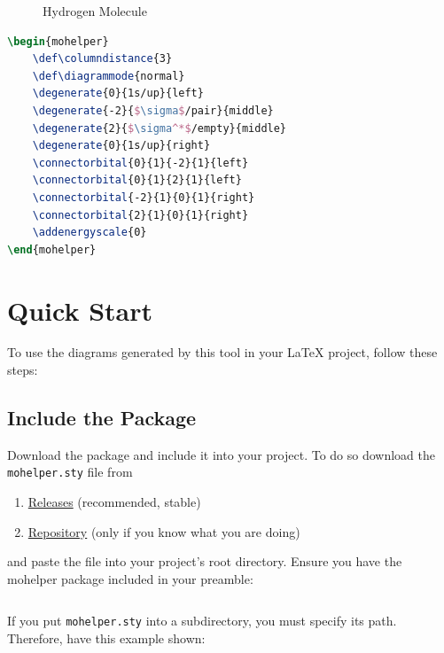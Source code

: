 \documentclass[12pt, a4paper]{article}
\begin{document}
\begin{figure}[h]
    \centering
    \begin{mohelper}
        \def\columndistance{3}
        \def\diagrammode{normal}
    \end{mohelper}
    \caption{Hydrogen Molecule}
    \label{fig:modiagram1}
\end{figure}

\begin{lstlisting}[language=TeX]
\begin{mohelper}
	\def\columndistance{3}
	\def\diagrammode{normal}
	\degenerate{0}{1s/up}{left}
	\degenerate{-2}{$\sigma$/pair}{middle}
	\degenerate{2}{$\sigma^*$/empty}{middle}
	\degenerate{0}{1s/up}{right}
	\connectorbital{0}{1}{-2}{1}{left}
	\connectorbital{0}{1}{2}{1}{left}
	\connectorbital{-2}{1}{0}{1}{right}
	\connectorbital{2}{1}{0}{1}{right}
	\addenergyscale{0}
\end{mohelper}
\end{lstlisting}

\section{Quick Start}
To use the diagrams generated by this tool in your LaTeX project, follow these steps:
\subsection{Include the Package}
Download the package and include it into your project. To do so download the \texttt{mohelper.sty} file from
\begin{enumerate}
    \item \href{https://github.com/thevicraft/modiagram-latex-integration/releases}{Releases} (recommended, stable)
    \item \href{https://thevicraft.github.io/modiagram-latex-integration/}{Repository} (only if you know what you are doing)
\end{enumerate}
and paste the file into your project's root directory. Ensure you have the mohelper package included in your preamble:
\begin{lstlisting}[language=TeX]

\end{lstlisting}
If you put \texttt{mohelper.sty} into a subdirectory, you must specify its path. Therefore, have this example shown:
\begin{lstlisting}[language=TeX]

\end{lstlisting}
\end{document}

